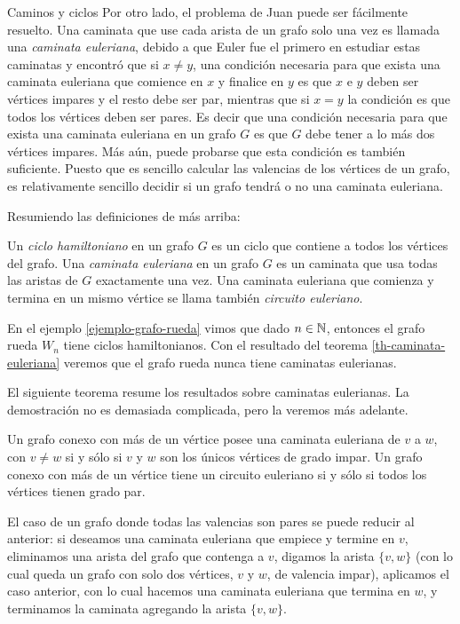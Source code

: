 \begin{section}{Caminos y ciclos}
Por otro lado, el problema de Juan puede ser fácilmente resuelto. Una caminata que use cada arista de un grafo solo una vez es llamada una \textit{caminata euleriana}, debido a que Euler  fue el primero en estudiar estas caminatas y encontró que si $x\not= y$, una condición necesaria para que exista una caminata euleriana que comience en $x$ y finalice en $y$ es que $x$ e $y$ deben ser vértices impares y el resto debe ser par, mientras que si $x=y$ la condición es que todos los vértices deben ser pares. Es decir que una condición necesaria para que exista una caminata euleriana en un grafo $G$
es que $G$ debe tener a lo más dos vértices impares. Más aún, puede probarse que esta condición es también suficiente. Puesto que es sencillo calcular las valencias de los vértices de un grafo, es relativamente sencillo decidir si un grafo tendrá o no una caminata euleriana. 

Resumiendo las definiciones de más arriba:

\begin{definicion}
Un \textit{ciclo hamiltoniano} en un grafo $G$ es un ciclo que contiene a todos los vértices del grafo. Una \textit{caminata euleriana} en un grafo $G$ es un caminata que usa todas las aristas de $G$ exactamente
una vez. Una caminata euleriana que comienza y termina en un mismo vértice se llama también \textit{circuito euleriano}.
\end{definicion}

\begin{ejemplo*}
    En  el ejemplo \ref{ejemplo-grafo-rueda} vimos que dado $n \in {\mathbb N}$, entonces el grafo rueda $W_n$ tiene ciclos hamiltonianos. Con el resultado del teorema \ref{th-caminata-euleriana} veremos que  el grafo rueda nunca tiene caminatas eulerianas. 
\end{ejemplo*}

El siguiente teorema resume los resultados sobre caminatas eulerianas. La demostración no es demasiada complicada, pero la veremos más adelante.  

\begin{teorema}\label{th-caminata-euleriana} Un grafo conexo con más de un vértice posee una caminata euleriana de $v$ a $w$, con $v \not= w$ si y sólo si $v$ y $w$ son los únicos vértices de grado impar. Un grafo conexo con más de un vértice tiene un circuito euleriano si y sólo si todos los vértices tienen grado par.
\end{teorema}

\begin{observacion}\label{obs-par-a-impar}
    El caso de un grafo donde todas las valencias son pares se puede reducir al anterior: si deseamos una caminata euleriana que empiece y termine en $v$, eliminamos una arista del grafo que contenga a $v$, digamos la arista $\{v,w\}$ (con lo cual queda un grafo  con solo dos vértices, $v$ y $w$, de valencia impar), aplicamos el caso  anterior, con lo cual hacemos una caminata euleriana que termina en  $w$, y terminamos la caminata agregando  la arista $\{v,w\}$. 
\end{observacion}


\end{section}
